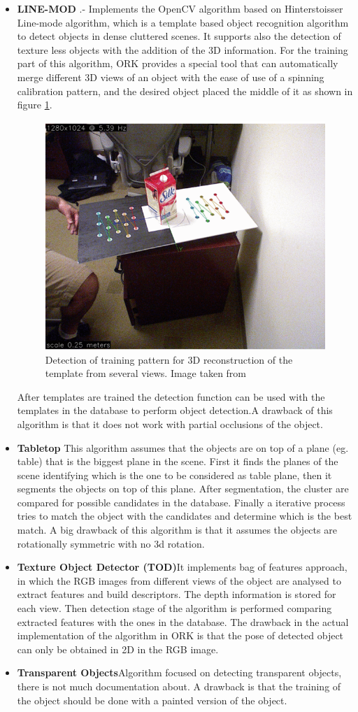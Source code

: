\documentclass[fontsize=12pt]{article}
\begin{document}
\begin{itemize}
\item \textbf{LINE-MOD} .- Implements the OpenCV algorithm based on Hinterstoisser Line-mode \cite{bib:linemode} algorithm, which is a template based object recognition algorithm to detect objects in dense cluttered scenes. It supports also the detection of texture less objects with the addition of the 3D information. For the training part of this algorithm, ORK provides a special tool that can automatically merge different 3D views of an object with the ease of use of a spinning calibration pattern, and the desired object placed the middle  of it as shown in figure \ref{fig:calibpat}. 
\begin{figure}[H]
\begin{center}
\includegraphics[width=0.5\linewidth]{images/spintable}
\caption{Detection of training pattern for 3D reconstruction of the template from several views. Image taken from \cite{bib:ORK}}
\label{fig:calibpat}
\end{center}
\end{figure}
After templates are trained the detection function can be used with the templates in the database to perform object detection.A drawback of this algorithm is that it does not work with partial occlusions of the object. 
\item \textbf{Tabletop} This algorithm assumes that the objects are on top of a plane (eg. table) that is the biggest plane in the scene. First it finds the planes of the scene identifying which is the one to be considered as table plane, then it segments the objects on top of this plane. After segmentation, the cluster are compared for possible candidates in the database. Finally a iterative process tries to match the object with the candidates and determine which is the best match. A big drawback of this algorithm is that it assumes the objects are rotationally symmetric with no 3d rotation. 
\item\textbf{Texture Object Detector (TOD)}It implements bag of features approach, in which the RGB images from different views of the object are analysed to extract features and build descriptors. The depth information is stored for each view. Then detection stage of the algorithm is performed comparing extracted features with the ones in the database. The drawback in the actual implementation of the algorithm in ORK is that  the pose of detected object can only be obtained in 2D in the RGB image. 
\item\textbf{Transparent Objects}Algorithm focused on detecting transparent objects, there is not much documentation about. A drawback is that the training of the object should be done with a painted version of the object. 
\end{itemize}
\end{document}
